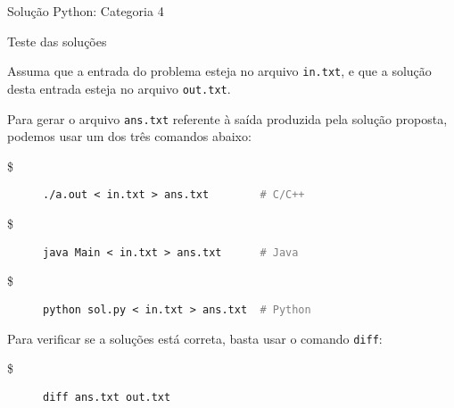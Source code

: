 \begin{frame}[fragile]{Solução Python: Categoria 4}
\end{frame}


\begin{frame}[fragile]{Teste das soluções}

    Assuma que a entrada do problema esteja no arquivo \texttt{in.txt}, e que a solução desta
    entrada esteja no arquivo \texttt{out.txt}.

    Para gerar o arquivo \texttt{ans.txt} referente à saída produzida pela solução proposta,
    podemos usar um dos três comandos abaixo:

    \begin{description}
        \item[\$] \texttt{./a.out < in.txt > ans.txt  \textcolor{gray}{\ \ \ \ \ \ \  \# C/C++}}
        \item[\$] \texttt{java Main < in.txt > ans.txt  \textcolor{gray}{\ \ \ \ \ \# Java}}
        \item[\$] \texttt{python sol.py < in.txt > ans.txt  \textcolor{gray}{\ \# Python}}
    \end{description}

    Para verificar se a soluções está correta, basta usar o comando \texttt{diff}:

    \begin{description}
        \item[\$] \texttt{diff ans.txt out.txt}
    \end{description}

\end{frame}
